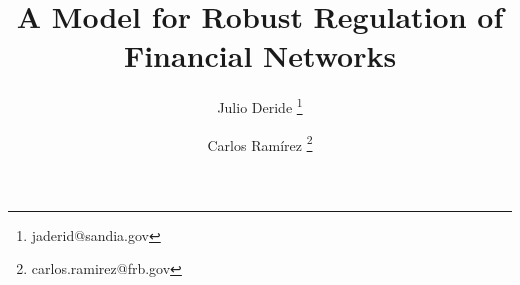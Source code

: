 \documentclass[12pt,letterpaper]{article}
\title{A Model for Robust Regulation of Financial Networks}
\author[1]{Julio Deride \thanks{jaderid@sandia.gov}}
\author[2]{Carlos Ram\'irez \thanks{carlos.ramirez@frb.gov}}
\affil[1]{Sandia National Laboratories, USA}
\affil[2]{Federal Reserve Board, USA}
\begin{document}
\maketitle
\baselineskip=15pt

\begin{abstract}

\end{abstract}






\nocite{*}


\end{document}
